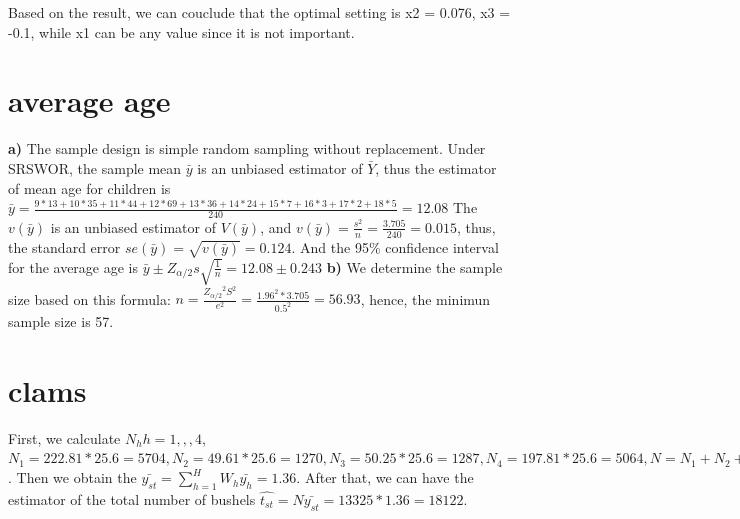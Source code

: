 \documentclass[11pt]{article}
\begin{document}
Based on the result, we can couclude that the optimal setting is x2 = 0.076, x3 = -0.1, while x1 can be any value since it is not important.

\section{average age}
\label{sec:2}
\textbf{a)} The sample design is simple random sampling without replacement. Under SRSWOR, the sample mean $\bar{y}$ is an unbiased estimator of $\bar{Y}$, thus the estimator of mean age for children is $\bar{y} = \frac{9*13 + 10*35 + 11*44 + 12*69 + 13*36 + 14*24 + 15*7 + 16*3 + 17*2 + 18*5}{240} = 12.08$
The $v(\bar{y})$ is an unbiased estimator of $V(\bar{y})$, and $v(\bar{y}) = \frac{s^2}{n} = \frac{3.705}{240}  = 0.015$, thus, the standard error $se(\bar{y}) = \sqrt{v(\bar{y})} = 0.124$. And the 95\% confidence interval for the average age is $\bar{y} \pm Z_{\alpha/2}s\sqrt{\frac{1}{n}} = 12.08 \pm 0.243$
\textbf{b)} We determine the sample size based on this formula: $n = \frac{{Z_{\alpha/2}}^2S^2}{e^2} = \frac{1.96^2*3.705}{0.5^2} = 56.93$, hence, the minimun sample size is 57.

\section{clams}
\label{sec:3}
First, we calculate $N_h h = 1,,,4$, $N_1 = 222.81 * 25.6 = 5704, N_2 = 49.61 * 25.6 = 1270, N_3 = 50.25 * 25.6 = 1287, N_4 = 197.81 * 25.6 = 5064, N = N_1 + N_2 + N_3 + N_4 = 13325$. Then we obtain the $\bar{y_{st}} = \sum_{h=1}^{H}W_h\bar{y_h} = 1.36 $. After that, we can have the estimator of the total number of bushels $\hat{t_{st}} = N\bar{y_{st}} = 13325 * 1.36 = 18122$.
\end{document}
